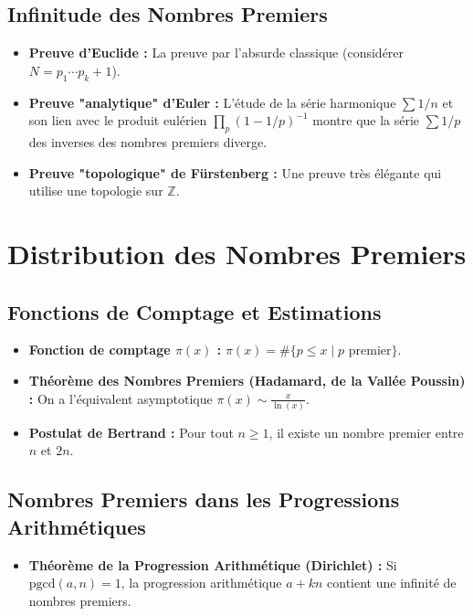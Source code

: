 \documentclass[12pt, a4paper, parskip=full]{report}
\theoremstyle{agregstyle}
\begin{document}
\subsection{Infinitude des Nombres Premiers}
\begin{itemize}
    \item \textbf{Preuve d'Euclide :} La preuve par l'absurde classique (considérer $N = p_1 \cdots p_k + 1$).
    \item \textbf{Preuve "analytique" d'Euler :} L'étude de la série harmonique $\sum 1/n$ et son lien avec le produit eulérien $\prod_p (1-1/p)^{-1}$ montre que la série $\sum 1/p$ des inverses des nombres premiers diverge.
    \item \textbf{Preuve "topologique" de Fürstenberg :} Une preuve très élégante qui utilise une topologie sur $\mathbb{Z}$.
\end{itemize}

\section{Distribution des Nombres Premiers}

\subsection{Fonctions de Comptage et Estimations}
\begin{itemize}
    \item \textbf{Fonction de comptage $\pi(x)$ :} $\pi(x) = \#\{p \le x \mid p \text{ premier}\}$.
    \item \textbf{Théorème des Nombres Premiers (Hadamard, de la Vallée Poussin) :} On a l'équivalent asymptotique $\pi(x) \sim \frac{x}{\ln(x)}$.
    \item \textbf{Postulat de Bertrand :} Pour tout $n \ge 1$, il existe un nombre premier entre $n$ et $2n$.
\end{itemize}

\subsection{Nombres Premiers dans les Progressions Arithmétiques}
\begin{itemize}
    \item \textbf{Théorème de la Progression Arithmétique (Dirichlet) :} Si $\mathrm{pgcd}(a,n)=1$, la progression arithmétique $a+kn$ contient une infinité de nombres premiers.
\end{itemize}
\end{document}
